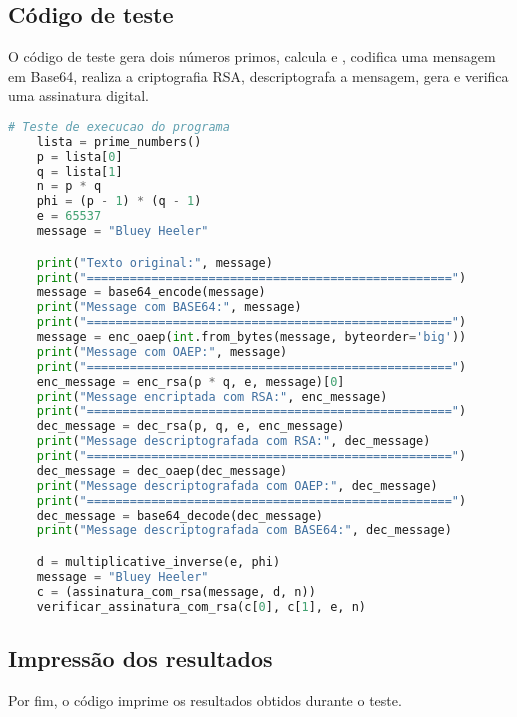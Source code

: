 \documentclass{article}
\begin{document}
\subsection{Código de teste}
O código de teste gera dois números primos, calcula  e , codifica uma mensagem em Base64, realiza a criptografia RSA, descriptografa a mensagem, gera e verifica uma assinatura digital.
\begin{lstlisting}[language=Python]
    # Teste de execucao do programa
    lista = prime_numbers()
    p = lista[0]
    q = lista[1]
    n = p * q
    phi = (p - 1) * (q - 1)
    e = 65537
    message = "Bluey Heeler"

    print("Texto original:", message)
    print("===================================================")
    message = base64_encode(message)
    print("Message com BASE64:", message)
    print("===================================================")
    message = enc_oaep(int.from_bytes(message, byteorder='big'))
    print("Message com OAEP:", message)
    print("===================================================")
    enc_message = enc_rsa(p * q, e, message)[0]
    print("Message encriptada com RSA:", enc_message)
    print("===================================================")
    dec_message = dec_rsa(p, q, e, enc_message)
    print("Message descriptografada com RSA:", dec_message)
    print("===================================================")
    dec_message = dec_oaep(dec_message)
    print("Message descriptografada com OAEP:", dec_message)
    print("===================================================")
    dec_message = base64_decode(dec_message)
    print("Message descriptografada com BASE64:", dec_message)

    d = multiplicative_inverse(e, phi)
    message = "Bluey Heeler"
    c = (assinatura_com_rsa(message, d, n))
    verificar_assinatura_com_rsa(c[0], c[1], e, n)
\end{lstlisting}

\subsection{Impressão dos resultados}
Por fim, o código imprime os resultados obtidos durante o teste.
\end{document}

